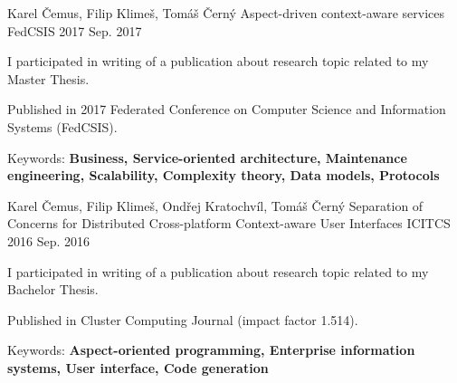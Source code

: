 \begin{cventries}
  \cventry
    {Karel Čemus, Filip Klimeš, Tomáš Černý}
    {Aspect-driven context-aware services}
    {FedCSIS 2017}
    {Sep. 2017}
    {
      \begin{cvitems}
        \item {I participated in writing of a publication about research topic related to my Master Thesis.}
        \item {Published in 2017 Federated Conference on Computer Science and Information Systems (FedCSIS).}
        \item {Keywords: \textbf{Business, Service-oriented architecture, Maintenance engineering, Scalability, Complexity theory, Data models, Protocols}}
      \end{cvitems}
    }
  \cventry
    {Karel Čemus, Filip Klimeš, Ondřej Kratochvíl, Tomáš Černý}
    {Separation of Concerns for Distributed Cross-platform Context-aware User Interfaces}
    {ICITCS 2016}
    {Sep. 2016}
    {
      \begin{cvitems}
        \item {I participated in writing of a publication about research topic related to my Bachelor Thesis.}
        \item {Published in Cluster Computing Journal (impact factor 1.514).}
        \item {Keywords: \textbf{Aspect-oriented programming, Enterprise information systems, User interface, Code generation}}
      \end{cvitems}
    }
\end{cventries}
